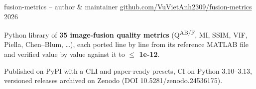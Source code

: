 \begin{cventries}
  \cventry
    {fusion-metrics -- \textnormal{author \& maintainer \quad \href{https://github.com/VuVietAnh2309/fusion-metrics}{github.com/VuVietAnh2309/fusion-metrics}}}
    {2026}
    {
      \begin{cvitems}
        \item {Python library of \textbf{35 image-fusion quality metrics} (Q\textsuperscript{AB/F}, MI, SSIM, VIF, Piella, Chen--Blum, \ldots), each ported line by line from its reference MATLAB file and verified value by value against it to \textbf{$\leq$ 1e-12}.}
        \item {Published on PyPI with a CLI and paper-ready presets, CI on Python 3.10--3.13, versioned releases archived on Zenodo (DOI 10.5281/zenodo.24536175).}
      \end{cvitems}
    }
\end{cventries}

\vspace{10pt}
